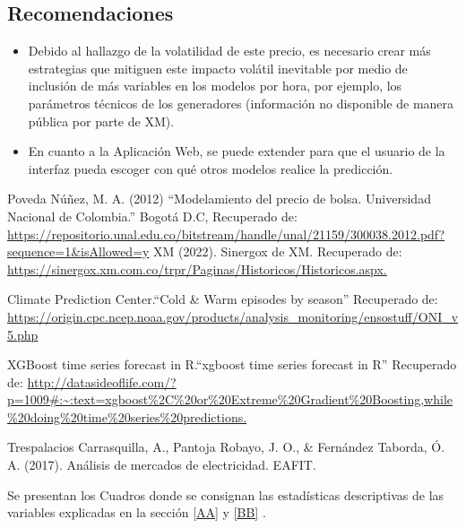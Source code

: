 \documentclass[conference, 10pt]{IEEEtran}
\begin{document}
\subsection{Recomendaciones}
\begin{itemize}
\item Debido al hallazgo de la volatilidad de este precio, es necesario crear más estrategias que mitiguen este impacto volátil inevitable por medio de inclusión de más variables en los modelos por hora, por ejemplo, los parámetros técnicos de los generadores (información no disponible de manera pública por parte de XM).

\item En cuanto a la Aplicación Web, se puede extender para que el usuario de la interfaz pueda escoger con qué otros modelos realice la predicción.

\end{itemize}

\begin{thebibliography}{00}
 Poveda Núñez, M. A. (2012) “Modelamiento del precio de bolsa. Universidad Nacional de Colombia.” Bogotá D.C, Recuperado de: \url{https://repositorio.unal.edu.co/bitstream/handle/unal/21159/300038.2012.pdf?sequence=1&isAllowed=y}
 XM (2022). Sinergox de XM. Recuperado de: \url{ https://sinergox.xm.com.co/trpr/Paginas/Historicos/Historicos.aspx.} 

Climate Prediction Center.“Cold \& Warm episodes by season” Recuperado de: \url{https://origin.cpc.ncep.noaa.gov/products/analysis_monitoring/ensostuff/ONI_v5.php}

XGBoost time series forecast in R.“xgboost time series forecast in R” Recuperado de: \url{http://datasideoflife.com/?p=1009#:~:text=xgboost\%2C\%20or\%20Extreme\%20Gradient\%20Boosting,while\%20doing\%20time\%20series\%20predictions.}

Trespalacios Carrasquilla, A., Pantoja Robayo, J. O., \& Fernández Taborda, Ó. A. (2017). Análisis de mercados de electricidad. EAFIT.

\end{thebibliography}


Se presentan los Cuadros donde se consignan las estadísticas descriptivas de las variables explicadas en la sección \ref{AA} y \ref{BB} .\\ 
\end{document}
